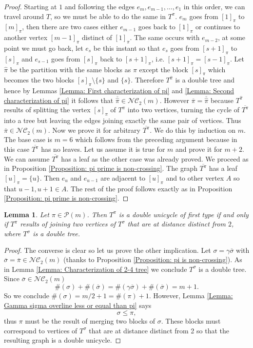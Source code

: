 \documentclass{article}
\newtheorem{lemma}      [theorem]{Lemma}
\theoremstyle{definition}
\newcommand{\cP}{\mathcal{P}}
\newcommand{\NC}{\mathcal{NC}}
\begin{document}
{\begin{proof}
Starting at $1$ and following the edges $e_m,e_{m-1},\dots,e_1$ in this order, we can travel around $T$, so we must be able to do the same in $T^\pi$. $e_m$ goes from $[1]_\pi$ to $[m]_\pi$, then there are two cases either $e_{m-1}$ goes back to $[1]_\pi$ or continues to another vertex $[m-1]_\pi$ distinct of $[1]_\pi$. The same occurs with $e_{m-2}$, at some point we must go back, let $e_s$ be this instant so that $e_s$ goes from $[s+1]_\pi$ to $[s]_\pi$ and $e_{s-1}$ goes from $[s]_\pi$ back to $[s+1]_\pi$, i.e. $[s+1]_\pi=[s-1]_\pi$. Let $\hat{\pi}$ be the partition with the same blocks as $\pi$ except the block $[s]_\pi$ which becomes the two blocks $[s]_\pi\setminus\{s\}$ and $\{s\}$. Therefore $T^{\hat{\pi}}$ is a double tree and hence by Lemmas \ref{Lemma: First characterization of pi} and \ref{Lemma: Second characterization of pi} it follows that $\overline{\hat{\pi}}\in \NC_2(m)$. However $\overline{\pi}=\overline{\hat{\pi}}$ because $T^{\hat{\pi}}$ results of splitting the vertex $[s]_\pi$ of $T^\pi$ into two vertices, turning the cycle of $\overline{T^\pi}$ into a tree but leaving the edges joining exactly the same pair of vertices. Thus $\overline{\pi}\in \NC_2(m)$. Now we prove it for arbitrary $\overline{T^\pi}$. We do this by induction on $m$. The base case is $m=6$ which follows from the preceding argument because in this case $\overline{T^\pi}$ has no leaves. Let us assume it is true for $m$ and prove it for $m+2$. We can assume $\overline{T^\pi}$ has a leaf as the other case was already proved. We proceed as in Proposition \ref{Proposition: pi prime is non-crossing}. The graph $\overline{T^\pi}$ has a leaf $[u]_\pi=\{u\}$. Then $e_u$ and $e_{u-1}$ are adjacent to $[u]_\pi$ and to other vertex $A$ so that $u-1,u+1\in A$. The rest of the proof follows exactly as in Proposition \ref{Proposition: pi prime is non-crossing}.
\end{proof}

\begin{lemma}\label{Lemma: Characterization of double unicycle first type}
Let $\pi\in \cP(m)$. Then $T^\pi$ is a double unicycle of first type if and only if $T^\pi$ results of joining two vertices of $T^\sigma$ that are at distance distinct from $2$, where $T^\sigma$ is a double tree.
\end{lemma}
\begin{proof}
The converse is clear so let us prove the other implication. Let $\sigma=\gamma\overline{\sigma}$ with $\overline{\sigma}=\overline{\pi}\in \NC_2(m)$ (thanks to Proposition \ref{Proposition: pi is non-crossing}). As in Lemma \ref{Lemma: Characterization of 2-4 tree} we conclude $T^\sigma$ is a double tree. Since $\overline{\sigma}\in \NC_2(m)$
$$\#(\sigma)+\#(\overline{\sigma})=\#(\gamma\overline{\sigma})+\#(\overline{\sigma})=m+1.$$
So we conclude $\#(\sigma)=m/2+1=\#(\pi)+1$. However, Lemma \ref{Lemma: Gamma sigma overline less or equal than pi} says
$$\sigma \leq \pi,$$
thus $\pi$ must be the result of merging two blocks of $\sigma$. These blocks must correspond to vertices of $T^\sigma$ that are at distance distinct from 2 so that the resulting graph is a double unicycle.
\end{proof}

}
\end{document}
